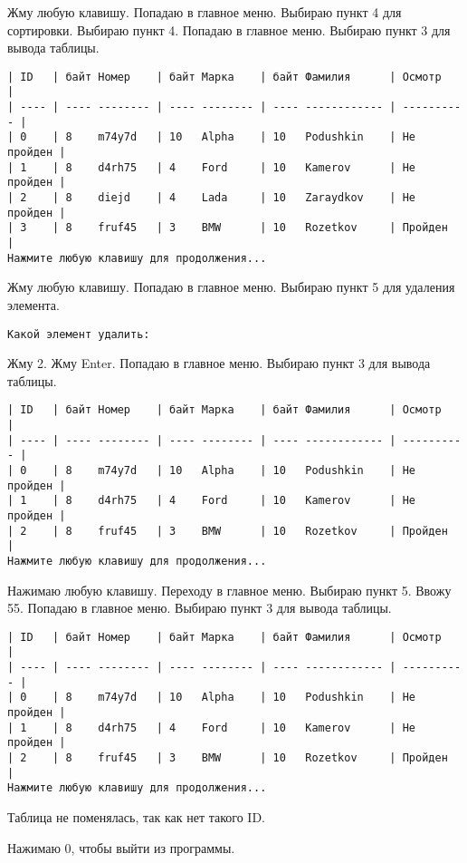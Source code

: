 Жму любую клавишу. Попадаю в главное меню. Выбираю пункт 4 для сортировки. Выбираю пункт 4. Попадаю в главное меню. Выбираю пункт 3 для вывода таблицы.

\begin{tcolorbox}
\begin{verbatim}
| ID   | байт Номер    | байт Марка    | байт Фамилия      | Осмотр     |
| ---- | ---- -------- | ---- -------- | ---- ------------ | ---------- |
| 0    | 8    m74y7d   | 10   Alpha    | 10   Podushkin    | Не пройден |
| 1    | 8    d4rh75   | 4    Ford     | 10   Kamerov      | Не пройден |
| 2    | 8    diejd    | 4    Lada     | 10   Zaraydkov    | Не пройден |
| 3    | 8    fruf45   | 3    BMW      | 10   Rozetkov     | Пройден    |
Нажмите любую клавишу для продолжения...
\end{verbatim}
\end{tcolorbox}

Жму любую клавишу. Попадаю в главное меню. Выбираю пункт 5 для удаления элемента.

\begin{tcolorbox}
\begin{verbatim}
Какой элемент удалить:
\end{verbatim}
\end{tcolorbox}

Жму 2. Жму Enter. Попадаю в главное меню. Выбираю пункт 3 для вывода таблицы.

\begin{tcolorbox}
\begin{verbatim}
| ID   | байт Номер    | байт Марка    | байт Фамилия      | Осмотр     |
| ---- | ---- -------- | ---- -------- | ---- ------------ | ---------- |
| 0    | 8    m74y7d   | 10   Alpha    | 10   Podushkin    | Не пройден |
| 1    | 8    d4rh75   | 4    Ford     | 10   Kamerov      | Не пройден |
| 2    | 8    fruf45   | 3    BMW      | 10   Rozetkov     | Пройден    |
Нажмите любую клавишу для продолжения...
\end{verbatim}
\end{tcolorbox}

Нажимаю любую клавишу. Переходу в главное меню. Выбираю пункт 5. Ввожу 55. Попадаю в главное меню. Выбираю пункт 3 для вывода таблицы.

\begin{tcolorbox}
\begin{verbatim}
| ID   | байт Номер    | байт Марка    | байт Фамилия      | Осмотр     |
| ---- | ---- -------- | ---- -------- | ---- ------------ | ---------- |
| 0    | 8    m74y7d   | 10   Alpha    | 10   Podushkin    | Не пройден |
| 1    | 8    d4rh75   | 4    Ford     | 10   Kamerov      | Не пройден |
| 2    | 8    fruf45   | 3    BMW      | 10   Rozetkov     | Пройден    |
Нажмите любую клавишу для продолжения...
\end{verbatim}
\end{tcolorbox}

Таблица не поменялась, так как нет такого ID.

Нажимаю 0, чтобы выйти из программы.